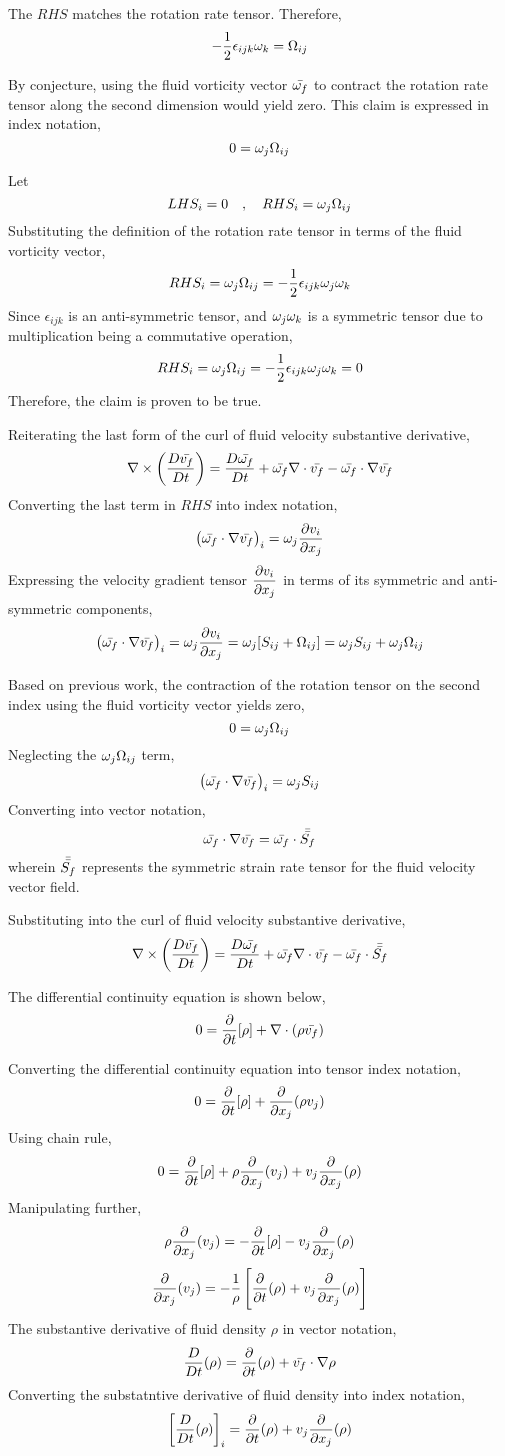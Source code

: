 \documentclass[class=report, 12pt, crop=false]{standalone}
\begin{document}
\begin{center}
The $RHS$ matches the rotation rate tensor. Therefore,
$$-\frac{1}{2}\epsilon_{ijk}\omega_k =  \Omega_{ij}$$

By conjecture, using the fluid vorticity vector $\bar{\omega_f}$ to contract the rotation rate tensor along the second dimension would yield zero. This claim is expressed in index notation,
$$0 = \omega_j\Omega_{ij}$$

Let 
$$LHS_i = 0 \quad,\quad RHS_i = \omega_j\Omega_{ij}$$
Substituting the definition of the rotation rate tensor in terms of the fluid vorticity vector,
$$RHS_i = \omega_j\Omega_{ij} = -\frac{1}{2}\epsilon_{ijk}\omega_j\omega_k$$
Since $\epsilon_{ijk}$ is an anti-symmetric tensor, and $\omega_j\omega_k$ is a symmetric tensor due to multiplication being a commutative operation,
$$RHS_i = \omega_j\Omega_{ij} = -\frac{1}{2}\epsilon_{ijk}\omega_j\omega_k = 0$$
Therefore, the claim is proven to be true.

Reiterating the last form of the curl of fluid velocity substantive derivative,
$$\nabla\times\left(\frac{D \bar{v_f}}{Dt}\right) = \frac{D \bar{\omega_f}}{Dt} + \bar{\omega_f}\nabla\cdot \bar{v_f} - \bar{\omega_f}\cdot\nabla \bar{v_f}$$
Converting the last term in $RHS$ into index notation,
$$\left(\bar{\omega_f}\cdot\nabla \bar{v_f}\right)_i = \omega_j\frac{\partial v_i}{\partial x_j}$$
Expressing the velocity gradient tensor $\displaystyle \frac{\partial v_i}{\partial x_j}$ in terms of its symmetric and anti-symmetric components,
$$\left(\bar{\omega_f}\cdot\nabla \bar{v_f}\right)_i = \omega_j\frac{\partial v_i}{\partial x_j} = \omega_j[S_{ij} + \Omega_{ij}] = \omega_jS_{ij} + \omega_j\Omega_{ij}$$

Based on previous work, the contraction of the rotation tensor on the second index using the fluid vorticity vector yields zero,
$$0 = \omega_j\Omega_{ij}$$
Neglecting the $\displaystyle \omega_j\Omega_{ij}$ term,
$$\left(\bar{\omega_f}\cdot\nabla \bar{v_f}\right)_i  = \omega_j S_{ij}$$
Converting into vector notation,
$$\bar{\omega_f}\cdot\nabla \bar{v_f}  = \bar{\omega_f} \cdot \bar{\bar{S_f}}$$
wherein $\bar{\bar{S_f}}$ represents the symmetric strain rate tensor for the fluid velocity vector field.

Substituting into the curl of fluid velocity substantive derivative,
$$\nabla\times\left(\frac{D \bar{v_f}}{Dt}\right) = \frac{D \bar{\omega_f}}{Dt} + \bar{\omega_f}\nabla\cdot \bar{v_f} - \bar{\omega_f} \cdot \bar{\bar{S_f}}$$


The differential continuity equation is shown below,
$$0 = \frac{\partial}{\partial t}[\rho] + \nabla\cdot(\rho\bar{v_f})$$

Converting the differential continuity equation into tensor index notation,
$$0 = \frac{\partial}{\partial t}[\rho] + \frac{\partial}{\partial x_j}(\rho v_j)$$
Using chain rule,
$$0 = \frac{\partial}{\partial t}[\rho] + \rho\frac{\partial}{\partial x_j}(v_j) + v_j\frac{\partial}{\partial x_j}(\rho)$$
Manipulating further,
$$\rho\frac{\partial}{\partial x_j}(v_j) = -\frac{\partial}{\partial t}[\rho] - v_j\frac{\partial}{\partial x_j}(\rho)$$
$$\frac{\partial}{\partial x_j}(v_j) = -\frac{1}{\rho}\left[\frac{\partial}{\partial t}(\rho) + v_j\frac{\partial}{\partial x_j}(\rho)\right]$$
The substantive derivative of fluid density $\rho$ in vector notation,
$$\frac{D }{Dt}(\rho) = \frac{\partial}{\partial t}(\rho) + \bar{v_f}\cdot\nabla\rho$$
Converting the substatntive derivative of fluid density into index notation,
$$\left[\frac{D }{Dt}(\rho)\right]_i = \frac{\partial}{\partial t}(\rho) + v_j\frac{\partial}{\partial x_j}(\rho)$$


\end{center}
\end{document}
